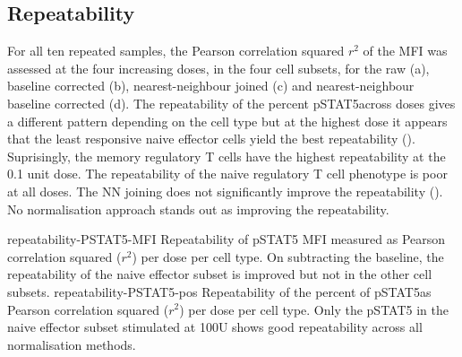 \subsection{Repeatability}


For all ten repeated samples, the Pearson correlation squared $r^2$ of the MFI was assessed at the four increasing doses, in the four cell subsets,
for the raw (a),
baseline corrected (b),
nearest-neighbour joined (c)
and nearest-neighbour baseline corrected (d).
The repeatability of the percent pSTAT5\positive across doses gives a different pattern depending on the cell type
but at the highest dose it appears that the least responsive naive effector cells yield the best
repeatability ().
Suprisingly, the memory regulatory T cells have the highest repeatability at the 0.1 unit dose.
The repeatability of the naive regulatory T cell phenotype is poor at all doses.  
The NN joining does not significantly improve the repeatability ().
No normalisation approach stands out as improving the repeatability.

{repeatability-PSTAT5-MFI}
{
  Repeatability of pSTAT5 MFI measured as Pearson correlation squared ($r^2$) per dose per cell type.
}
{
  On subtracting the baseline, the repeatability of the naive effector subset is improved but not in the other cell subsets.
} 
{repeatability-PSTAT5-pos}
{
  Repeatability of the percent of pSTAT5\positive as Pearson correlation squared ($r^2$) per dose per cell type.
}
{
  Only the pSTAT5 in the naive effector subset stimulated at 100U shows good repeatability across all normalisation methods.
}

%
%


